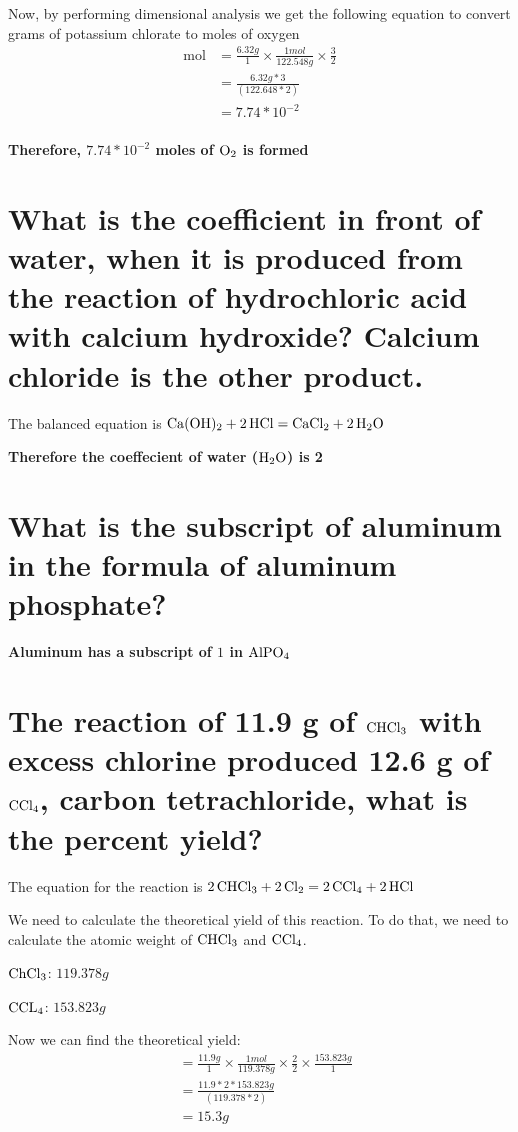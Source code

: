 \documentclass{scrartcl}
\begin{document}
Now, by performing dimensional analysis we get the following equation to convert
grams of potassium chlorate to moles of oxygen
\begin{align*}
  \text{mol}&=\frac{6.32g}{1}\times\frac{1mol}{122.548g}\times\frac{3}{2}\\
  &=\frac{6.32g*3}{(122.648*2)}\\
  &=7.74*10^{-2}\\
\end{align*}

\textbf{Therefore, \(7.74*10^{-2}\) moles of \(\ce{O2}\) is formed}

\section{What is the coefficient in front of water, when it is produced from the reaction of hydrochloric acid with calcium hydroxide? Calcium chloride is the other product.}
\label{sec:org3ce3e22}
The balanced equation is
\(\ce{Ca(OH)2 + 2HCl}=\ce{CaCl2 + 2H2O}\)

\textbf{Therefore the coeffecient of water (\(\ce{H2O}\)) is 2}

\section{What is the subscript of aluminum in the formula of aluminum phosphate?}
\label{sec:orga9b8d0e}
\textbf{Aluminum has a subscript of \(1\) in \(\ce{AlPO4}\)}

\section{The reaction of 11.9 g of \(\ce{CHCl3}\) with excess chlorine produced 12.6 g of \(\ce{CCl4}\), carbon tetrachloride, what is the percent yield?}
\label{sec:orgbed1fad}
The equation for the reaction is
\(\ce{2CHCl3 + 2Cl2}=\ce{2CCl4 + 2HCl}\)

We need to calculate the theoretical yield of this reaction. To do that, we need
to calculate the atomic weight of \(\ce{CHCl3}\) and \(\ce{CCl4}\).

\(\ce{ChCl3}\): \(119.378g\)

\(\ce{CCL4}\): \(153.823g\)

Now we can find the theoretical yield:
\begin{align*}
  &=\frac{11.9g}{1}\times\frac{1mol}{119.378g}\times\frac{2}{2}\times\frac{153.823g}{1}\\
  &=\frac{11.9*2*153.823g}{(119.378*2)}\\
  &=15.3g\\
\end{align*}
\end{document}
